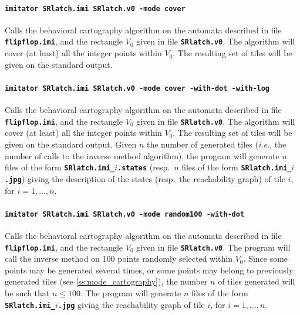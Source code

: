 \documentclass[a4paper,11pt]{report}
\newcommand{\imitatorExec}{\code{imitator}}
\newcommand{\code}[1]{\textbf{\texttt{#1}}}
\newcommand{\ie}{\textcolor{colorok}{\textit{i.e.}, }}
\begin{document}
\paragraph{\code{\imitatorExec{} SRlatch.imi SRlatch.v0 -mode cover}}
Calls the behavioral cartography algorithm on the automata described in file \code{flipflop.imi}, and the rectangle $V_0$ given in file \code{SRlatch.v0}.
The algorithm will cover (at least) all the integer points within $V_0$.
The resulting set of tiles will be given on the standard output.


\paragraph{\code{\imitatorExec{} SRlatch.imi SRlatch.v0 -mode cover -with-dot -with-log}}
Calls the behavioral cartography algorithm on the automata described in file \code{flipflop.imi}, and the rectangle $V_0$ given in file \code{SRlatch.v0}.
The algorithm will cover (at least) all the integer points within $V_0$.
The resulting set of tiles will be given on the standard output.
Given $n$ the number of generated tiles (\ie{} the number of calls to the inverse method algorithm), the program will generate $n$ files of the form \code{SRlatch.imi\_$i$.states} (resp.~$n$ files of the form \code{SRlatch.imi\_$i$.jpg}) giving the description of the states (resp.~the reachability graph) of tile $i$, for $i = 1, \dots, n$.


\paragraph{\code{\imitatorExec{} SRlatch.imi SRlatch.v0 -mode random100 -with-dot}}
Calls the behavioral cartography algorithm on the automata described in file \code{flipflop.imi}, and the rectangle $V_0$ given in file \code{SRlatch.v0}.
The program will call the inverse method on 100 points randomly selected within $V_0$.
Since some points may be generated several times, or some points may belong to previously generated tiles (see \cref{ss:mode_cartography}), the number $n$ of tiles generated will be such that $n \leq 100$.
The program will generate $n$ files of the form \code{SRlatch.imi\_$i$.jpg} giving the reachability graph of tile $i$, for $i = 1, \dots, n$.
\end{document}
